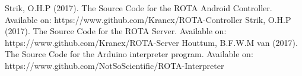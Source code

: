 
\begin{thebibliography}{3}
Strik, O.H.P (2017). The Source Code for the ROTA Android Controller. Available on: https://www.github.com/Kranex/ROTA-Controller
Strik, O.H.P (2017). The Source Code for the ROTA Server. Available on: https://www.github.com/Kranex/ROTA-Server
Houttum, B.F.W.M van (2017). The Source Code for the Arduino interpreter program. Available on: https://www.github.com/NotSoScientific/ROTA-Interpreter
\end{thebibliography}
